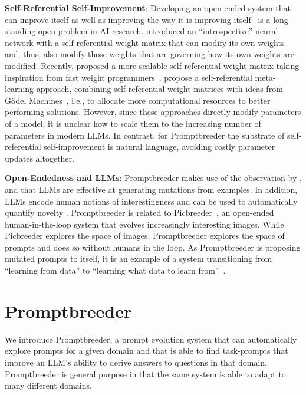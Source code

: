 \documentclass{article} %
\begin{document}
\textbf{Self-Referential Self-Improvement}: 
Developing an open-ended system that can improve itself as well as improving the way it is improving itself~\citep{schmidhuber1993selfreferential,schmidhuber2003godel} is a long-standing open problem in AI research. \citet{schmidhuber1993selfreferential} introduced an ``introspective'' neural network with a self-referential weight matrix that can modify its own weights and, thus, also modify those weights that are governing how its own weights are modified. Recently, \citet{DBLP:conf/icml/IrieSCS22} proposed a more scalable self-referential weight matrix taking inspiration from fast weight programmers~\citep{schmidhuber1992learning}. \citet{DBLP:journals/corr/abs-2212-14392} propose a self-referential meta-learning approach, combining self-referential weight matrices with ideas from Gödel Machines~\citep{schmidhuber2003godel}, i.e., to allocate more computational resources to better performing solutions. However, since these approaches directly modify parameters of a model, it is unclear how to scale them to the increasing number of parameters in modern LLMs. In contrast, for Promptbreeder the substrate of self-referential self-improvement is natural language, avoiding costly parameter updates altogether.

\textbf{Open-Endedness and LLMs}: 
Promptbreeder makes use of the observation by \cite{DBLP:journals/corr/abs-2206-08896}, \cite{DBLP:journals/corr/abs-2302-12170} and \cite{DBLP:journals/corr/abs-2302-14838} that LLMs are effective at generating mutations from examples. In addition, LLMs encode human notions of interestingness and can be used to automatically quantify novelty \citep{DBLP:journals/corr/abs-2306-01711}. Promptbreeder is related to Picbreeder~\citep{secretan2008picbreeder}, an open-ended human-in-the-loop system that evolves increasingly interesting images. While Picbreeder explores the space of images, Promptbreeder explores the space of prompts and does so without humans in the loop. As Promptbreeder is proposing mutated prompts to itself, it is an example of a system transitioning from ``learning from data'' to ``learning what data to learn from''~\citep{DBLP:journals/corr/abs-2211-07819}.

\section{Promptbreeder}
We introduce Promptbreeder, a prompt evolution system that can automatically explore prompts for a given domain and that is able to find task-prompts that improve an LLM's ability to derive answers to questions in that domain. Promptbreeder is general purpose in that the same system is able to adapt to many different domains. 
\end{document}
